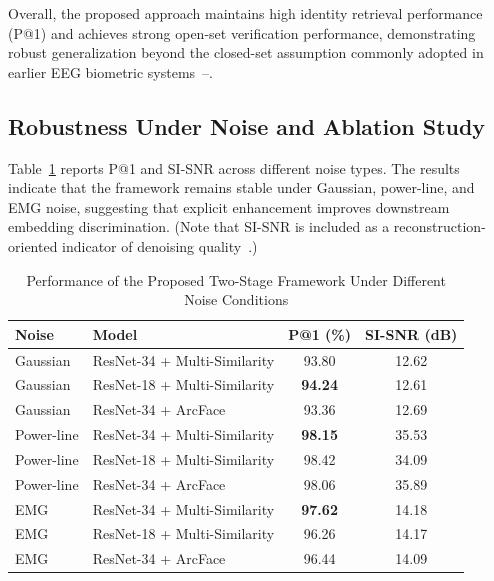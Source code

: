 \documentclass[conference]{IEEEtran}
\begin{document}
Overall, the proposed approach maintains high identity retrieval performance (P@1) and achieves strong open-set verification performance, demonstrating robust generalization beyond the closed-set assumption commonly adopted in earlier EEG biometric systems~\cite{b1}--\cite{b3}.

\subsection{Robustness Under Noise and Ablation Study}

Table~\ref{tab:noise_robustness} reports P@1 and SI-SNR across different noise types. The results indicate that the framework remains stable under Gaussian, power-line, and EMG noise, suggesting that explicit enhancement improves downstream embedding discrimination. (Note that SI-SNR is included as a reconstruction-oriented indicator of denoising quality~\cite{b13}.)

\begin{table}[htbp]
\caption{Performance of the Proposed Two-Stage Framework Under Different Noise Conditions}
\label{tab:noise_robustness}
\begin{center}
\begin{tabular}{llcc}
\toprule
\textbf{Noise} & \textbf{Model} & \textbf{P@1 (\%)} & \textbf{SI-SNR (dB)} \\
\midrule
Gaussian & ResNet-34 + Multi-Similarity & 93.80 & 12.62 \\
Gaussian & ResNet-18 + Multi-Similarity & \textbf{94.24} & 12.61 \\
Gaussian & ResNet-34 + ArcFace          & 93.36 & 12.69 \\
\midrule
Power-line & ResNet-34 + Multi-Similarity & \textbf{98.15} & 35.53 \\
Power-line & ResNet-18 + Multi-Similarity & 98.42 & 34.09 \\
Power-line & ResNet-34 + ArcFace          & 98.06 & 35.89 \\
\midrule
EMG & ResNet-34 + Multi-Similarity & \textbf{97.62} & 14.18 \\
EMG & ResNet-18 + Multi-Similarity & 96.26 & 14.17 \\
EMG & ResNet-34 + ArcFace          & 96.44 & 14.09 \\
\bottomrule
\end{tabular}
\end{center}
\end{table}
\end{document}
